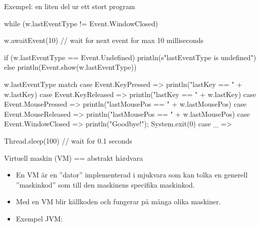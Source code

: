 \documentclass{simpleslides}
\begin{document}
  
\begin{Slide}{Exempel: en liten del ur ett stort program}
\begin{Code}
  while (w.lastEventType != Event.WindowClosed) {
    w.awaitEvent(10)  // wait for next event for max 10 milliseconds

    if (w.lastEventType == Event.Undefined) 
      println(s"lastEventType is undefined")
    else 
      println(Event.show(w.lastEventType))

    w.lastEventType match {
      case Event.KeyPressed    => println("lastKey == " + w.lastKey)
      case Event.KeyReleased   => println("lastKey == " + w.lastKey)
      case Event.MousePressed  => println("lastMousePos == " + w.lastMousePos)
      case Event.MouseReleased => println("lastMousePos == " + w.lastMousePos)
      case Event.WindowClosed  => println("Goodbye!"); System.exit(0)
      case _ =>
    }

    Thread.sleep(100) // wait for 0.1 seconds
  }
\end{Code}
\end{Slide}


\begin{Slide}{Virtuell maskin (VM) == abstrakt hårdvara}
\begin{multicols}{2}
\begin{itemize}\small
\item En VM är en ''dator'' implementerad i mjukvara som kan tolka en generell ''maskinkod'' som  till den  maskinens specifika maskinkod.

\item Med en VM blir källkoden  och fungerar på många olika maskiner.

\item Exempel JVM: \\ 


\end{itemize}

\columnbreak %

\end{multicols}
\end{Slide}
\end{document}
